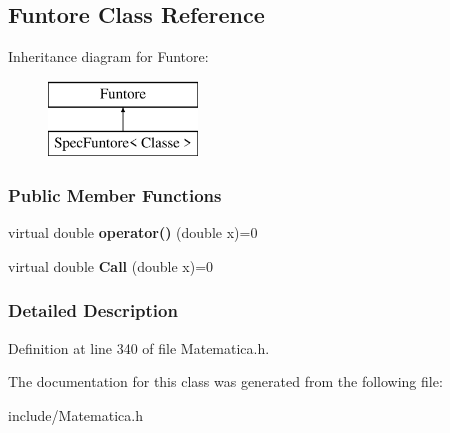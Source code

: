 \hypertarget{classFuntore}{}\subsection{Funtore Class Reference}
\label{classFuntore}
Inheritance diagram for Funtore\+:\begin{figure}[H]
\begin{center}
\leavevmode
\includegraphics[height=2.000000cm]{classFuntore}
\end{center}
\end{figure}
\subsubsection*{Public Member Functions}
\begin{DoxyCompactItemize}
\item 
virtual double {\bfseries operator()} (double x)=0\hypertarget{classFuntore_a98ed28d91355af58355955ba885ebacb}{}\label{classFuntore_a98ed28d91355af58355955ba885ebacb}

\item 
virtual double {\bfseries Call} (double x)=0\hypertarget{classFuntore_af020783f738a26ffbc75399721893712}{}\label{classFuntore_af020783f738a26ffbc75399721893712}

\end{DoxyCompactItemize}


\subsubsection{Detailed Description}


Definition at line 340 of file Matematica.\+h.



The documentation for this class was generated from the following file\+:\begin{DoxyCompactItemize}
\item 
include/Matematica.\+h\end{DoxyCompactItemize}
